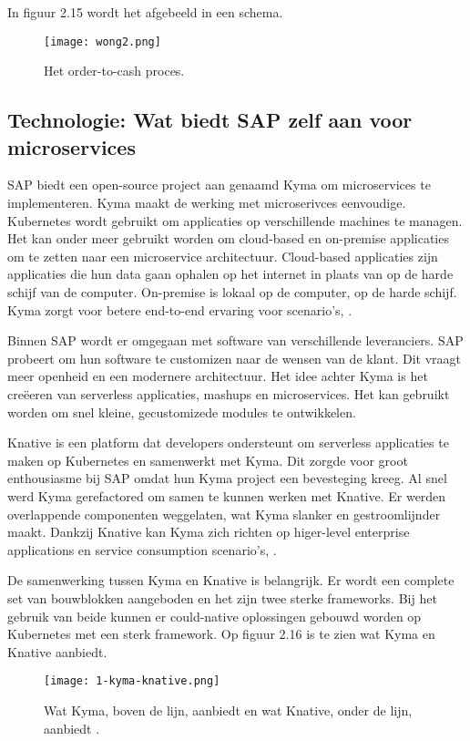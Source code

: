 In figuur 2.15 wordt het afgebeeld in een schema.
\begin{figure}[h!]
	\texttt{[image: wong2.png]}
	\caption{Het order-to-cash proces. \textcite{Wong2018}}
	\centering
\end{figure}


\subsection{Technologie: Wat biedt SAP zelf aan voor microservices}
SAP biedt een open-source project aan genaamd Kyma om microservices te implementeren.
Kyma maakt de werking met microserivces eenvoudige. Kubernetes wordt gebruikt om applicaties op verschillende machines te managen. Het kan onder meer gebruikt worden om cloud-based en on-premise applicaties om te zetten naar een microservice architectuur. Cloud-based applicaties zijn applicaties die hun data gaan ophalen op het internet in plaats van op de harde schijf van de computer. On-premise is lokaal op de computer, op de harde schijf. Kyma zorgt voor betere end-to-end ervaring voor scenario's, \textcite{Kyma2019}.

Binnen SAP wordt er omgegaan met software van verschillende leveranciers. SAP probeert om hun software te customizen naar de  wensen van de klant. Dit vraagt meer openheid en een modernere architectuur. 
Het idee achter Kyma is het creëeren van serverless applicaties, mashups en microservices. Het kan  gebruikt worden om snel kleine, gecustomizede modules te ontwikkelen. 

Knative is een platform dat developers ondersteunt om serverless applicaties te maken op Kubernetes en samenwerkt met Kyma. Dit zorgde voor groot enthousiasme bij SAP omdat hun Kyma project een bevesteging kreeg. Al snel  werd Kyma gerefactored om samen te kunnen  werken met Knative. Er werden overlappende componenten  weggelaten, wat Kyma slanker en gestroomlijnder maakt. Dankzij Knative kan Kyma zich richten op higer-level enterprise applications en service consumption scenario's, \textcite{Semerdzhiev2018}.

De samenwerking tussen Kyma en Knative is belangrijk. Er wordt een complete set van bouwblokken aangeboden en het zijn twee sterke frameworks. Bij het gebruik van beide kunnen er could-native oplossingen gebouwd worden op Kubernetes met een sterk framework. Op figuur 2.16 is te zien wat Kyma en Knative aanbiedt. \textcite{Hofmann2018}
\begin{figure}[h!]
	\texttt{[image: 1-kyma-knative.png]}
	\caption{Wat Kyma, boven de lijn, aanbiedt en wat Knative, onder de lijn, aanbiedt \textcite{Hofmann2018}.}
	\centering
\end{figure}


